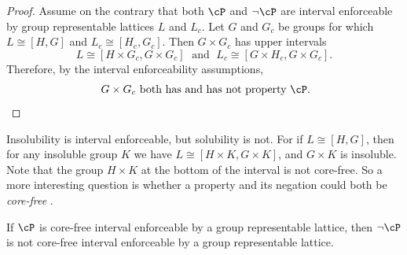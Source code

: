 \begin{frame}[label=IEPropsLemmaProof]{}
\begin{proof}
Assume on the contrary that both $\cP$ and $\neg \cP$
are interval enforceable by group representable lattices $L$ and $L_c$. 
\vskip2mm
Let $G$ and $G_c$ be groups for which $L\cong [H,G]$ and $L_c\cong
[H_c,G_c]$.
\vskip2mm
Then $G\times G_c$ has upper intervals 
\[L\cong [H\times G_c, G\times G_c]\; \text{ and }\;
L_c\cong [G\times H_c, G\times G_c].\]  
Therefore, by the interval enforceability
assumptions, 
\[
\text{ $G\times G_c$ both has and has not property $\cP$.}
\] 
\end{proof}
\end{frame}









\begin{frame}[label=IEPropsConjecture]{}
Insolubility is interval enforceable, but solubility is not. 
\vskip4mm
For if $L\cong [H, G]$, then for any insoluble 
group $K$ we have $L\cong [H\times K, G\times K]$, and $G\times K$ is
insoluble.  
\vskip4mm
Note that the group $H\times K$ at the bottom of
the interval is not core-free.  So a more interesting question is whether a
property and its negation could both be \emph{core-free} \IE.  
\vskip4mm
\begin{conjecture}
\label{conjecture:isle-prop2}
If $\cP$ is core-free interval enforceable by a group representable lattice,
then $\neg \cP$ is not core-free interval enforceable by a group representable lattice.
\end{conjecture}
\end{frame}

